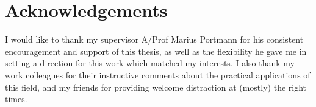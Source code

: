 \chapter{Acknowledgements}

I would like to thank my supervisor A/Prof Marius Portmann for his consistent encouragement and support of this thesis, as well as the flexibility he gave me in setting a direction for this work which matched my interests. I also thank my work colleagues for their instructive comments about the practical applications of this field, and my friends for providing welcome distraction at (mostly) the right times.
